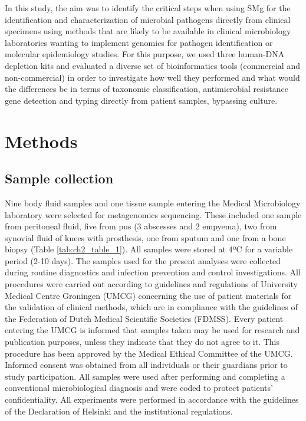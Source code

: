 In this study, the aim was to identify the critical steps when using \ac{SMg} for the identification and characterization of microbial pathogens directly from clinical specimens using methods that are likely to be available in clinical microbiology laboratories wanting to implement genomics for pathogen identification or molecular epidemiology studies. 
For this purpose, we used three human-DNA depletion kits and evaluated a diverse set of bioinformatics tools (commercial and non-commercial) in order to investigate how well they performed and what would the differences be in terms of taxonomic classification, antimicrobial resistance gene detection and typing directly from patient samples, bypassing culture. 

\section{Methods} \label{sec:methods}

\subsection{Sample collection} \label{ssec:sample_collection}

Nine body fluid samples and one tissue sample entering the Medical Microbiology laboratory were selected for metagenomics sequencing. 
These included one sample from peritoneal fluid, five from pus (3 abscesses and 2 empyema), two from synovial fluid of knees with prosthesis, one from sputum and one from a bone biopsy (Table \ref{tab:ch2_table_1}). 
All samples were stored at 4ºC for a variable period (2-10 days). 
The samples used for the present analyses were collected during routine diagnostics and infection prevention and control investigations. 
All procedures were carried out according to guidelines and regulations of University Medical Centre Groningen (UMCG) concerning the use of patient materials for the validation of clinical methods, which are in compliance with the guidelines of the Federation of Dutch Medical Scientific Societies (FDMSS).
Every patient entering the UMCG is informed that samples taken may be used for research and publication purposes, unless they indicate that they do not agree to it. 
This procedure has been approved by the Medical Ethical Committee of the UMCG. 
Informed consent was obtained from all individuals or their guardians prior to study participation. 
All samples were used after performing and completing a conventional microbiological diagnosis and were coded to protect patients’ confidentiality. 
All experiments were performed in accordance with the guidelines of the Declaration of Helsinki and the institutional regulations. 

